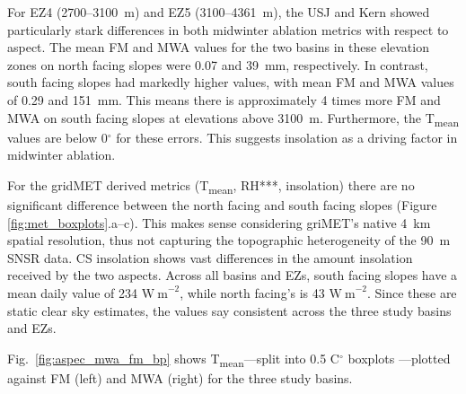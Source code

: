 For EZ4 (2700--3100~m) and EZ5 (3100--4361~m), the USJ and Kern showed particularly stark differences in both midwinter ablation metrics with respect to aspect. The mean FM and MWA values for the two basins in these elevation zones on north facing slopes were 0.07 and 39~mm, respectively. In contrast, south facing slopes had markedly higher values, with mean FM and MWA values of 0.29 and 151~mm. This means there is approximately 4 times more FM and MWA on south facing slopes at elevations above 3100~m. Furthermore, the T\textsubscript{mean} values are below 0$^{\circ}$ for these errors. This suggests insolation as a driving factor in midwinter ablation.


For the gridMET derived metrics (T\textsubscript{mean}, RH***, insolation) there are no significant difference between the north facing and south facing slopes (Figure \ref{fig:met_boxplots}.a--c). This makes sense considering griMET's native 4~km spatial resolution, thus not capturing the topographic heterogeneity of the 90~m SNSR data. CS insolation shows vast differences in the amount insolation received by the two aspects. Across all basins and EZs, south facing slopes have a mean daily value of 234 $\mathrm{W~m}^{-2}$, while north facing's is 43 $\mathrm{W~m}^{-2}$. Since these are static clear sky estimates, the values say consistent across the three study basins and EZs.

Fig.~\ref{fig:aspec_mwa_fm_bp} shows T\textsubscript{mean}---split into 0.5 C$^{\circ}$ boxplots ---plotted against FM (left) and MWA (right) for the three study basins.

